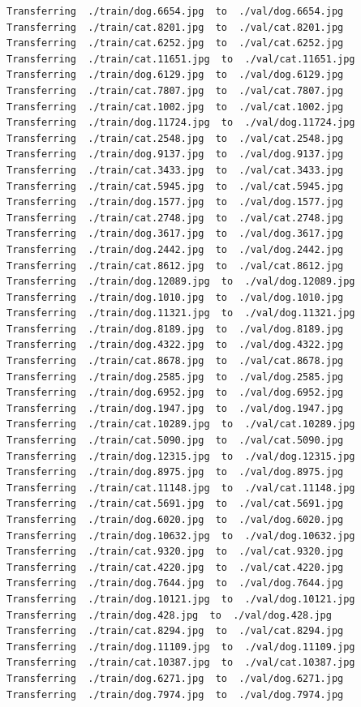 \documentclass[]{book}
\theoremstyle{definition}
\theoremstyle{definition}
\theoremstyle{definition}
\theoremstyle{remark}
\begin{document}
\begin{verbatim}
Transferring  ./train/dog.6654.jpg  to  ./val/dog.6654.jpg
Transferring  ./train/cat.8201.jpg  to  ./val/cat.8201.jpg
Transferring  ./train/cat.6252.jpg  to  ./val/cat.6252.jpg
Transferring  ./train/cat.11651.jpg  to  ./val/cat.11651.jpg
Transferring  ./train/dog.6129.jpg  to  ./val/dog.6129.jpg
Transferring  ./train/cat.7807.jpg  to  ./val/cat.7807.jpg
Transferring  ./train/cat.1002.jpg  to  ./val/cat.1002.jpg
Transferring  ./train/dog.11724.jpg  to  ./val/dog.11724.jpg
Transferring  ./train/cat.2548.jpg  to  ./val/cat.2548.jpg
Transferring  ./train/dog.9137.jpg  to  ./val/dog.9137.jpg
Transferring  ./train/cat.3433.jpg  to  ./val/cat.3433.jpg
Transferring  ./train/cat.5945.jpg  to  ./val/cat.5945.jpg
Transferring  ./train/dog.1577.jpg  to  ./val/dog.1577.jpg
Transferring  ./train/cat.2748.jpg  to  ./val/cat.2748.jpg
Transferring  ./train/dog.3617.jpg  to  ./val/dog.3617.jpg
Transferring  ./train/dog.2442.jpg  to  ./val/dog.2442.jpg
Transferring  ./train/cat.8612.jpg  to  ./val/cat.8612.jpg
Transferring  ./train/dog.12089.jpg  to  ./val/dog.12089.jpg
Transferring  ./train/dog.1010.jpg  to  ./val/dog.1010.jpg
Transferring  ./train/dog.11321.jpg  to  ./val/dog.11321.jpg
Transferring  ./train/dog.8189.jpg  to  ./val/dog.8189.jpg
Transferring  ./train/dog.4322.jpg  to  ./val/dog.4322.jpg
Transferring  ./train/cat.8678.jpg  to  ./val/cat.8678.jpg
Transferring  ./train/dog.2585.jpg  to  ./val/dog.2585.jpg
Transferring  ./train/dog.6952.jpg  to  ./val/dog.6952.jpg
Transferring  ./train/dog.1947.jpg  to  ./val/dog.1947.jpg
Transferring  ./train/cat.10289.jpg  to  ./val/cat.10289.jpg
Transferring  ./train/cat.5090.jpg  to  ./val/cat.5090.jpg
Transferring  ./train/dog.12315.jpg  to  ./val/dog.12315.jpg
Transferring  ./train/dog.8975.jpg  to  ./val/dog.8975.jpg
Transferring  ./train/cat.11148.jpg  to  ./val/cat.11148.jpg
Transferring  ./train/cat.5691.jpg  to  ./val/cat.5691.jpg
Transferring  ./train/dog.6020.jpg  to  ./val/dog.6020.jpg
Transferring  ./train/dog.10632.jpg  to  ./val/dog.10632.jpg
Transferring  ./train/cat.9320.jpg  to  ./val/cat.9320.jpg
Transferring  ./train/cat.4220.jpg  to  ./val/cat.4220.jpg
Transferring  ./train/dog.7644.jpg  to  ./val/dog.7644.jpg
Transferring  ./train/dog.10121.jpg  to  ./val/dog.10121.jpg
Transferring  ./train/dog.428.jpg  to  ./val/dog.428.jpg
Transferring  ./train/cat.8294.jpg  to  ./val/cat.8294.jpg
Transferring  ./train/dog.11109.jpg  to  ./val/dog.11109.jpg
Transferring  ./train/cat.10387.jpg  to  ./val/cat.10387.jpg
Transferring  ./train/dog.6271.jpg  to  ./val/dog.6271.jpg
Transferring  ./train/dog.7974.jpg  to  ./val/dog.7974.jpg

\end{verbatim}
\end{document}
